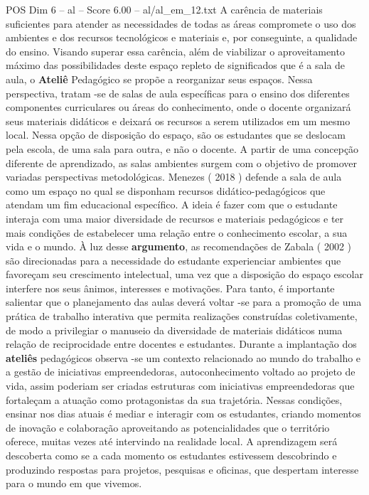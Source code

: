 \begin{textsample}{POS Dim 6 – al – Score 6.00 – al/al\_em\_12.txt}
A carência de materiais suficientes para atender as necessidades de todas as áreas compromete o uso dos ambientes e dos recursos tecnológicos e materiais e, por conseguinte, a qualidade do ensino.
Visando superar essa carência, além de viabilizar o aproveitamento máximo das possibilidades deste espaço repleto de significados que é a sala de aula, o \textbf{Ateliê} Pedagógico se propõe a reorganizar seus espaços.
Nessa perspectiva, tratam -se de salas de aula específicas para o ensino dos diferentes componentes curriculares ou áreas do conhecimento, onde o docente organizará seus materiais didáticos e deixará os recursos a serem utilizados em um mesmo local.
Nessa opção de disposição do espaço, são os estudantes que se deslocam pela escola, de uma sala para outra, e não o docente.
A partir de uma concepção diferente de aprendizado, as salas ambientes surgem com o objetivo de promover variadas perspectivas metodológicas.
Menezes ( 2018 ) defende a sala de aula como um espaço no qual se disponham recursos didático-pedagógicos que atendam um fim educacional específico.
A ideia é fazer com que o estudante interaja com uma maior diversidade de recursos e materiais pedagógicos e ter mais condições de estabelecer uma relação entre o conhecimento escolar, a sua vida e o mundo.
À luz desse \textbf{argumento}, as recomendações de Zabala ( 2002 ) são direcionadas para a necessidade do estudante experienciar ambientes que favoreçam seu crescimento intelectual, uma vez que a disposição do espaço escolar interfere nos seus ânimos, interesses e motivações.
Para tanto, é importante salientar que o planejamento das aulas deverá voltar -se para a promoção de uma prática de trabalho interativa que permita realizações construídas coletivamente, de modo a privilegiar o manuseio da diversidade de materiais didáticos numa relação de reciprocidade entre docentes e estudantes.
Durante a implantação dos \textbf{ateliês} pedagógicos observa -se um contexto relacionado ao mundo do trabalho e a gestão de iniciativas empreendedoras, autoconhecimento voltado ao projeto de vida, assim poderiam ser criadas estruturas com iniciativas empreendedoras que fortaleçam a atuação como protagonistas da sua trajetória.
Nessas condições, ensinar nos dias atuais é mediar e interagir com os estudantes, criando momentos de inovação e colaboração aproveitando as potencialidades que o território oferece, muitas vezes até intervindo na realidade local.
A aprendizagem será descoberta como se a cada momento os estudantes estivessem descobrindo e produzindo respostas para projetos, pesquisas e oficinas, que despertam interesse para o mundo em que vivemos.

\end{textsample}
